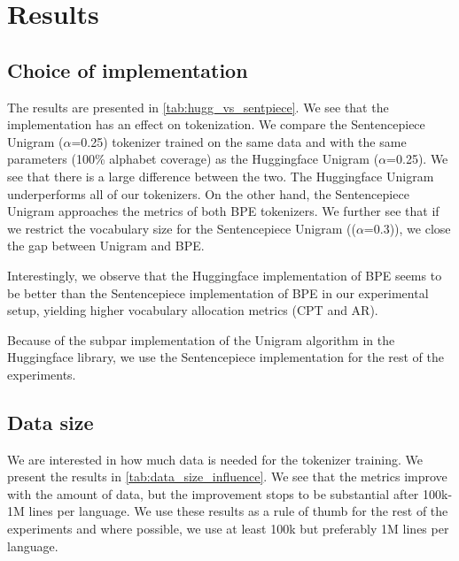 \section{Results}

\subsection{Choice of implementation}
\label{sec:implementation}



The results are presented in \autoref{tab:hugg_vs_sentpiece}. We see that the implementation has an effect on tokenization. We compare the Sentencepiece Unigram ($\alpha$=0.25) tokenizer trained on the same data and with the same parameters (100\% alphabet coverage) as the Huggingface Unigram ($\alpha$=0.25). We see that there is a large difference between the two. The Huggingface Unigram underperforms all of our tokenizers. On the other hand, the Sentencepiece Unigram approaches the metrics of both BPE tokenizers. We further see that if we restrict the vocabulary size for the Sentencepiece Unigram (($\alpha$=0.3)), we close the gap between Unigram and BPE. 

Interestingly, we observe that the Huggingface implementation of BPE seems to be better than the Sentencepiece implementation of BPE in our experimental setup, yielding higher vocabulary allocation metrics (CPT and AR).

Because of the subpar implementation of the Unigram algorithm in the Huggingface library, we use the Sentencepiece implementation for the rest of the experiments.

\subsection{Data size}
\label{sec:data_size}



We are interested in how much data is needed for the tokenizer training. We present the results in \autoref{tab:data_size_influence}. We see that the metrics improve with the amount of data, but the improvement stops to be substantial after 100k-1M lines per language. We use these results as a rule of thumb for the rest of the experiments and where possible, we use at least 100k but preferably 1M lines per language.

